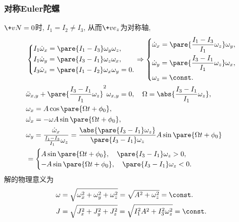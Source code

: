 \documentclass[../LectureNotes.tex]{subfiles}
\begin{document}


\subsubsection{对称Euler陀螺} %
\label{ssub:对称euler陀螺}

$\+vN = 0$时, $I_1 = I_2 \neq I_3$, 从而$\+ve_z$为对称轴,
\begin{align*}
    & \left\{ \begin{aligned}
        &I_1\dot\omega_x = \pare{I_1 - I_3} \omega_y\omega_z, \\
        &I_1\dot\omega_y = \pare{I_3 - I_1} \omega_z\omega_x, \\
        &I_3\dot\omega_z = \pare{I_1 - I_2} \omega_x\omega_y = 0.
    \end{aligned} \right. \Rightarrow \left\{ \begin{aligned}
        &\dot\omega_x = \pare{\frac{I_1-I_3}{I_1}\omega_z} \omega_y, \\
        &\dot\omega_y = \pare{\frac{I_3-I_1}{I_1}\omega_z} \omega_x, \\
        &\omega_z = \const.
    \end{aligned} \right. \\
    & \ddot{\omega}_{x,y} + \pare{\frac{I_3-I_1}{I_1}\omega_z}^2 \omega_{x,y} = 0, \quad \Omega = \abs{\frac{I_3 - I_1}{I_1}\omega_z}, \\
    & \omega_x = A\cos\pare{\Omega t + \phi_0}, \\
    & \dot{\omega_x} = -\omega A\sin\pare{\Omega t + \phi_0}, \\
    & \omega_y = \frac{\dot{\omega}_x}{\frac{I_1-I_3}{I_1}\omega_z} = \frac{\abs{\pare{I_3-I_1}\omega_z}}{\pare{I_3-I_1}\omega_z}A\sin\pare{\Omega t + \phi_0} \\
    &= \begin{cases}
        A\sin\pare{\Omega t + \phi_0},\quad \pare{I_3 -I_1}\omega_z > 0, \\
        -A\sin\pare{\Omega t + \phi_0},\quad \pare{I_3 - I_1}\omega_z < 0.
    \end{cases}
\end{align*}
解的物理意义为
\begin{align*}
    \omega &= \sqrt{\omega_x^2 + \omega_y^2 + \omega_z^2} = \sqrt{A^2 + \omega_z^2} = \const. \\
    J &= \sqrt{J_x^2 + J_y^2 + J_z^2} = \sqrt{I_1^2A^2 + I_3^2\omega_z^2} = \const.
\end{align*}
\end{document}
